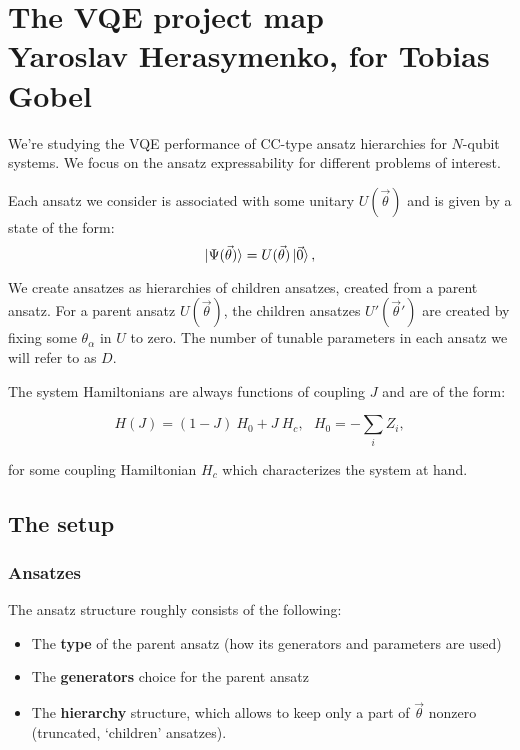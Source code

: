 \documentclass[10pt, a4paper]{article}
\begin{document}
\section*{The VQE project map\\
\small{Yaroslav Herasymenko, for Tobias Gobel}}

We're studying the VQE performance of CC-type ansatz hierarchies for $N$-qubit systems. We focus on the ansatz expressability for different problems of interest. 

Each ansatz we consider is associated with some unitary $U(\vec{\theta})$ and is given by a state of the form:
\begin{equation*}
\ket{\Psi(\vec{\theta})}=U(\vec{\theta})\ket{\vec{0}},
\end{equation*}

We create ansatzes as hierarchies of children ansatzes, created from a parent ansatz. For a parent ansatz $U(\vec{\theta})$, the children ansatzes $U'(\vec{\theta}')$ are created by fixing some $\theta_{\alpha}$ in $U$ to zero. The number of tunable parameters in each ansatz we will refer to as $D$.

The system Hamiltonians are always functions of coupling $J$ and are of the form:

\begin{equation}
H(J)=(1-J)~H_0+J~H_c,~~~H_0=-\sum_i Z_i,
\end{equation}

for some coupling Hamiltonian $H_c$ which characterizes the system at hand.

\subsection*{The setup}

\subsubsection*{Ansatzes}

The ansatz structure roughly consists of the following:

\begin{itemize}
\item The \textbf{type} of the parent ansatz (how its generators and parameters are used)
\item The \textbf{generators} choice for the parent ansatz
\item The \textbf{hierarchy} structure, which allows to keep only a part of $\vec{\theta}$ nonzero (truncated, `children' ansatzes).
\end{itemize}
\end{document}

